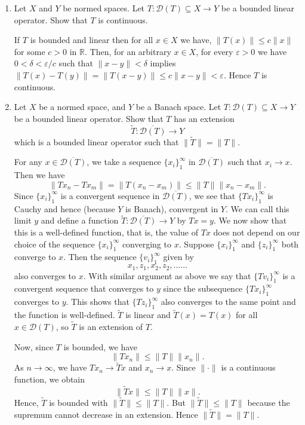 \documentclass[12pt]{article}
\newcommand{\rl}{\mathbb{R}}
\newcommand{\cD}{\mathcal{D}}
\begin{document}
\begin{enumerate}
\item Let $X$ and $Y$ be normed spaces.
    Let $T: \cD(T) \subseteq X \to Y$ be a bounded linear
    operator. Show that $T$ is continuous.
\begin{mybox}

    If $T$ is bounded and linear then for all $x\in X$ we have,
    $\|T(x)\|\leq c\|x\|$ for some $c>0$ in $\rl$. Then,
    for an arbitrary $x\in X$,
    for every $\varepsilon>0$ we have
    $0<\delta<\varepsilon/c$ such that
    $\|x-y\|<\delta$ implies
    $\|T(x)-T(y)\|=\|T(x-y)\|\leq c\|x-y\|<\varepsilon$.
    Hence $T$ is continuous.
\end{mybox}
 
\item Let $X$ be a normed space, and $Y$ be a Banach space.
    Let $T: \cD(T) \subseteq X \to Y$ be a bounded linear
    operator. Show that $T$ has an extension 
    $$\widetilde T:  \overline{\cD(T)}  \to Y$$ which is a
    bounded linear operator such that
    $\|\widetilde T\| = \|T\|$.
\begin{mybox}

    For any $x\in \overline{\cD(T)}$, we take a sequence
    $\{x_i\}_1^\infty$ in $\overline{\cD(T)}$ such that
    $x_i\longrightarrow x$. Then we have
    $$\|Tx_n-Tx_m\|=\|T(x_n-x_m)\|\leq\|T\|\|x_n-x_m\|.$$
    Since $\{x_i\}_1^\infty$ is a convergent sequence
    in $\overline{\cD(T)}$, we see that $\{Tx_i\}_1^\infty$
    is Cauchy and hence (because $Y$ is Banach),
    convergent in $Y$. We can call this
    limit $y$ and define a function $\widetilde{T}:
    \overline{\cD(T)}  \to Y$ by $Tx=y$. We now show that
    this is a well-defined function, that is, the value of
    $Tx$ does not depend on our choice of the sequence
    $\{x_i\}_1^\infty$ converging to $x$. Suppose
    $\{x_i\}_1^\infty$ and $\{z_i\}_1^\infty$ both converge
    to $x$. Then the sequence $\{v_i\}_1^\infty$ given by
    $$x_1,z_1,x_2,z_2,\ldots\ldots$$
    also converges to $x$. With similar argument as above we
    say that $\{Tv_i\}_1^\infty$ is a convergent sequence
    that converges to $y$ since the subsequence
    $\{Tx_i\}_1^\infty$ converges to $y$. This shows that
    $\{Tz_i\}_1^\infty$ also converges to the same point and
    the function is well-defined. $\widetilde{T}$ is linear
    and $\widetilde{T}(x)=T(x)$ for all $x\in\cD(T)$, so
    $\widetilde{T}$ is an extension of $T$.

    \vspace*{2mm}
    Now, since $T$ is bounded, we have
    $$\|Tx_n\|\leq\|T\|\|x_n\|.$$ As $n\to\infty$, we have
    $Tx_n\to\widetilde{T}x$ and $x_n\to x$. Since $\|\cdot\|$
    is a continuous function, we obtain
    $$\|\widetilde{T}x\|\leq\|T\|\|x\|.$$
    Hence, $\widetilde{T}$ is bounded with $\|\widetilde{T}\|
    \leq\|T\|$. But $\|\widetilde{T}\|\leq\|T\|$ because the
    supremum cannot decrease in an extension.
    Hence $\|\widetilde{T}\|=\|T\|$.
\end{mybox}
 

\end{enumerate}
\end{document}
